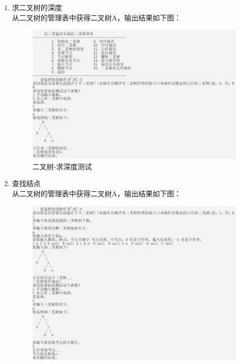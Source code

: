 \documentclass[supercite]{Experimental_Report}
\theoremstyle{definition}
\begin{document}
\begin{enumerate}
\begin{figure}[htb]
\begin{center}
			\end{center}
		\end{figure}
		\newpage
	\item 求二叉树的深度\\
	从二叉树的管理表中获得二叉树A，输出结果如下图：
		\begin{figure}[htb]
			\begin{center}
				\includegraphics[scale=0.50]{images/二叉树-求深度.png}
				\caption{二叉树-求深度测试}
				\label{fig2-3}
			\end{center}
		\end{figure}
	\item 查找结点\\
	从二叉树的管理表中获得二叉树A，输出结果如下图：
		\begin{figure}[htb]
			\begin{center}
				\includegraphics[scale=0.50]{images/二叉树-查找节点.png}

\end{center}
\end{figure}
\end{enumerate}
\end{document}
